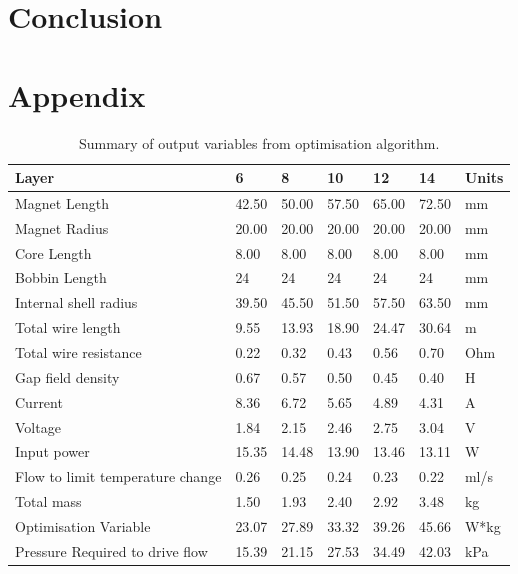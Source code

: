 \documentclass[a4paper,12pt]{article}
\begin{document}
\newpage

\section{Conclusion}

\newpage

\section{Appendix}

\begin{table}[h!]
    \centering
    \caption{Summary of output variables from optimisation algorithm.}
    \label{tb:optout}
    \begin{tabular}{M | l | l | l | l | l | l}
        \hline
        Layer                            & 6  & 8  & 10 & 12 & 14 & Units \\
        \hline\hline
        Magnet Length                    & 42.50 & 50.00 & 57.50 & 65.00 & 72.50 & mm    \\
        \hline
        Magnet Radius                    & 20.00 & 20.00 & 20.00 & 20.00 & 20.00 & mm    \\
        \hline
        Core Length                      & 8.00  & 8.00  & 8.00  & 8.00  & 8.00  & mm    \\
        \hline
        Bobbin Length                    & 24 & 24 & 24 & 24 & 24 & mm    \\
        \hline
        Internal shell radius            & 39.50 & 45.50 & 51.50 & 57.50 & 63.50 & mm    \\
        \hline
        Total wire length                & 9.55  & 13.93 & 18.90 & 24.47 & 30.64 & m     \\
        \hline
        Total wire resistance            & 0.22  & 0.32  & 0.43  & 0.56  & 0.70  & Ohm   \\
        \hline
        Gap field density                & 0.67  & 0.57  & 0.50  & 0.45  & 0.40  & H     \\
        \hline
        Current                          & 8.36  & 6.72  & 5.65  & 4.89  & 4.31  & A     \\
        \hline
        Voltage                          & 1.84  & 2.15  & 2.46  & 2.75  & 3.04  & V     \\
        \hline
        Input power                      & 15.35 & 14.48 & 13.90 & 13.46 & 13.11 & W     \\
        \hline
        Flow to limit temperature change & 0.26  & 0.25  & 0.24  & 0.23  & 0.22  & ml/s  \\
        \hline
        Total mass                       & 1.50  & 1.93  & 2.40  & 2.92  & 3.48  & kg    \\
        \hline
        Optimisation Variable            & 23.07 & 27.89 & 33.32 & 39.26 & 45.66 & W*kg  \\
        \hline
        Pressure Required to drive flow  & 15.39 & 21.15 & 27.53 & 34.49 & 42.03 & kPa  \\
        \hline
    \end{tabular}
\end{table}

\newpage

\printbibliography
\end{document}
